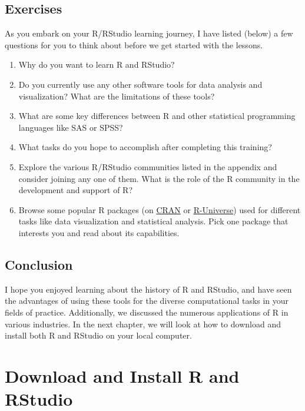 \documentclass[
  letterpaper,
  DIV=11,
  numbers=noendperiod]{scrreprt}
\begin{document}
\section{Exercises}\label{exercises}

As you embark on your R/RStudio learning journey, I have listed (below)
a few questions for you to think about before we get started with the
lessons.

\begin{enumerate}
\def\labelenumi{\roman{enumi}.}
\item
  Why do you want to learn R and RStudio?
\item
  Do you currently use any other software tools for data analysis and
  visualization? What are the limitations of these tools?
\item
  What are some key differences between R and other statistical
  programming languages like SAS or SPSS?
\item
  What tasks do you hope to accomplish after completing this training?
\item
  Explore the various R/RStudio communities listed in the appendix and
  consider joining any one of them. What is the role of the R community
  in the development and support of R?
\item
  Browse some popular R packages (on
  \href{https://cran.r-project.org/}{CRAN} or
  \href{https://r-universe.dev/search/}{R-Universe}) used for different
  tasks like data visualization and statistical analysis. Pick one
  package that interests you and read about its capabilities.
\end{enumerate}

\section{Conclusion}\label{conclusion}

I hope you enjoyed learning about the history of R and RStudio, and have
seen the advantages of using these tools for the diverse computational
tasks in your fields of practice. Additionally, we discussed the
numerous applications of R in various industries. In the next chapter,
we will look at how to download and install both R and RStudio on your
local computer.


\chapter{Download and Install R and RStudio}\label{sec-download-install}
\end{document}
